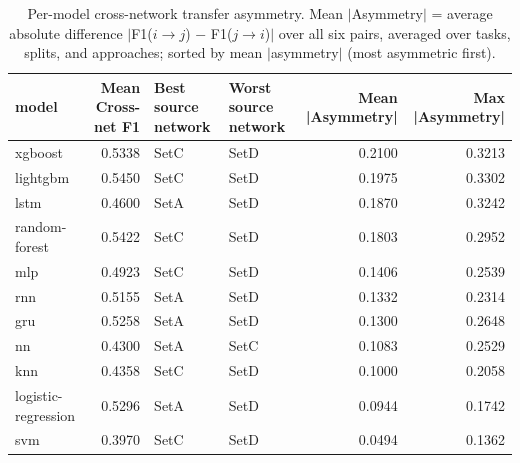 \begin{table}
\caption{Per-model cross-network transfer asymmetry. Mean $|$Asymmetry$|$ = average absolute difference $|$F1($i\to j$) $-$ F1($j\to i$)$|$ over all six pairs, averaged over tasks, splits, and approaches; sorted by mean $|$asymmetry$|$ (most asymmetric first).}
\label{tab:q4_per_model}
\begin{tabular}{lrllrr}
\toprule
model & Mean Cross-net F1 & Best source network & Worst source network & Mean |Asymmetry| & Max |Asymmetry| \\
\midrule
xgboost & 0.5338 & SetC & SetD & 0.2100 & 0.3213 \\
lightgbm & 0.5450 & SetC & SetD & 0.1975 & 0.3302 \\
lstm & 0.4600 & SetA & SetD & 0.1870 & 0.3242 \\
random-forest & 0.5422 & SetC & SetD & 0.1803 & 0.2952 \\
mlp & 0.4923 & SetC & SetD & 0.1406 & 0.2539 \\
rnn & 0.5155 & SetA & SetD & 0.1332 & 0.2314 \\
gru & 0.5258 & SetA & SetD & 0.1300 & 0.2648 \\
nn & 0.4300 & SetA & SetC & 0.1083 & 0.2529 \\
knn & 0.4358 & SetC & SetD & 0.1000 & 0.2058 \\
logistic-regression & 0.5296 & SetA & SetD & 0.0944 & 0.1742 \\
svm & 0.3970 & SetC & SetD & 0.0494 & 0.1362 \\
\bottomrule
\end{tabular}
\end{table}
